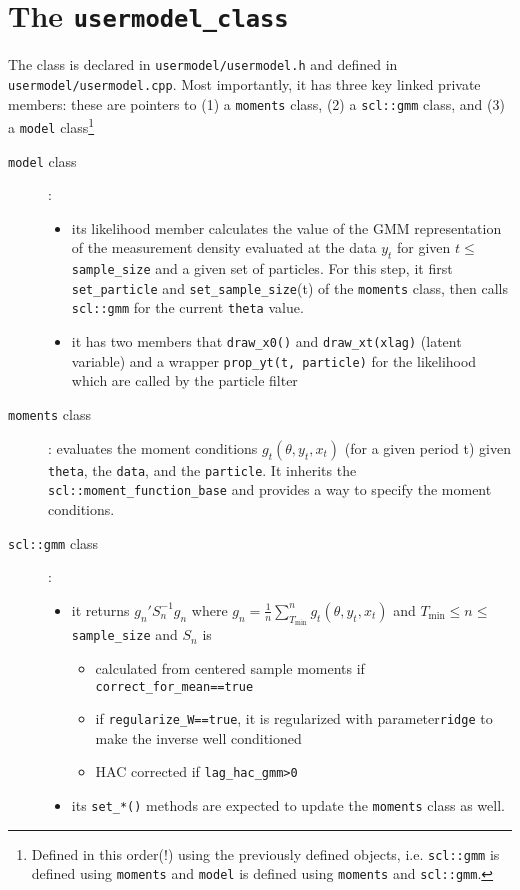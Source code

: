 \documentclass[11pt, letterpaper, notitlepage]{article}
\begin{document}
\pagebreak 

\section*{The \texttt{usermodel\_class}}

The class is declared in \texttt{usermodel/usermodel.h} and defined in \texttt{usermodel/usermodel.cpp}. Most importantly, it has three key linked private members: these are pointers to (1) a \texttt{moments} class, (2) a \texttt{scl::gmm} class, and (3) a \texttt{model} class\footnote{Defined in this order(!) using the previously defined objects, i.e. \texttt{scl::gmm} is defined using \texttt{moments} and \texttt{model} is defined using \texttt{moments} and \texttt{scl::gmm}.}

\begin{description}
\item[\texttt{model} class]: 

\begin{itemize}
\item its likelihood member calculates the value of the GMM representation of the measurement density evaluated at the data $y_t$ for given $t\leq$ \texttt{sample\_size} and a given set of particles. For this step, it first \texttt{set\_particle} and \texttt{set\_sample\_size}(t) of the \texttt{moments} class, then calls \texttt{scl::gmm} for the current \texttt{theta} value. 
\item it has two members that \texttt{draw\_x0()} and \texttt{draw\_xt(xlag)} (latent variable) and a wrapper \texttt{prop\_yt(t, particle)} for the likelihood which are called by the particle filter 
\end{itemize}
\item[\texttt{moments} class]: evaluates the moment conditions $g_t(\theta, y_t, x_t)$ (for a given period t) given \texttt{theta}, the \texttt{data}, and the \texttt{particle}. It inherits the \texttt{scl::moment\_function\_base} and provides a way to specify the moment conditions.
\item[\texttt{scl::gmm} class]:
 
\begin{itemize}
\item it returns $g_n'S_n^{-1} g_n$ where $g_n = \frac{1}{n}\sum_{T_{\min}}^{n} g_t(\theta, y_t, x_t)$ and $T_{\min}\leq n\leq$\texttt{sample\_size} and $S_n$ is 
\begin{itemize}
\item calculated from centered sample moments if \texttt{correct\_for\_mean==true}
\item if \texttt{regularize\_W==true}, it is regularized  with parameter\texttt{ridge} to make the inverse well conditioned
\item HAC corrected if \texttt{lag\_hac\_gmm>0}
\end{itemize}
\item its \texttt{set\_*()} methods are expected to update the \texttt{moments} class as well. 
\end{itemize}
\end{description}
\end{document}
